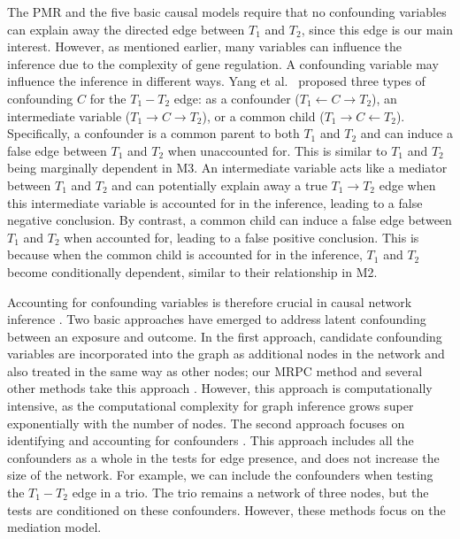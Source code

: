 \documentclass[12pt,letterpaper]{report}
\begin{document}
\begin{doublespace}
The PMR and the five basic causal models require that no confounding variables can explain away the directed edge between $T_1$ and $T_2$, since this edge is our main interest.  However, as mentioned earlier, many variables can influence the inference due to the complexity of gene regulation.  A confounding variable may influence the inference in different ways.  Yang et al.~\cite{yang2017identifying} proposed three types of confounding $C$ for the $T_1-T_2$ edge: as a confounder ($T_1 \leftarrow C \rightarrow T_2$), an intermediate variable ($T_1 \rightarrow C \rightarrow T_2$), or a common child ($T_1 \rightarrow C \leftarrow T_2$). Specifically, a confounder is a common parent to both $T_1$ and $T_2$ and can induce a false edge between $T_1$ and $T_2$ when unaccounted for.  This is similar to $T_1$ and $T_2$ being marginally dependent in M3.  
An intermediate variable acts like a mediator between $T_1$ and $T_2$ and can potentially explain away a true $T_1 \rightarrow T_2$ edge when this intermediate variable is accounted for in the inference, leading to a false negative conclusion.  By contrast, a common child can induce a false edge between $T_1$ and $T_2$ when accounted for, leading to a false positive conclusion.  This is because when the common child is accounted for in the inference, $T_1$ and $T_2$ become conditionally dependent, similar to their relationship in M2.  

Accounting for confounding variables is therefore crucial in causal network inference \cite{burgess2015network, yang2017identifying, shan2019identification, amar2021graphical, zhao2024adjusting}. Two basic approaches have emerged to address latent confounding between an exposure and outcome. In the first approach, candidate confounding variables are incorporated into the graph as additional nodes in the network and also treated in the same way as other nodes; our MRPC method and several other methods take this approach \cite{badsha2019learning, amar2021graphical}. However, this approach is computationally intensive, as the computational complexity for graph inference grows super exponentially with the number of nodes. The second approach focuses on identifying and accounting for confounders \cite{burgess2015network, yang2017identifying, shan2019identification}. This approach includes all the confounders as a whole in the tests for edge presence, and does not increase the size of the network.  For example, we can include the confounders when testing the $T_1 - T_2$ edge in a trio.  The trio remains a network of three nodes, but the tests are conditioned on these confounders.  However, these methods focus on the mediation model.


\end{doublespace}
\end{document}
